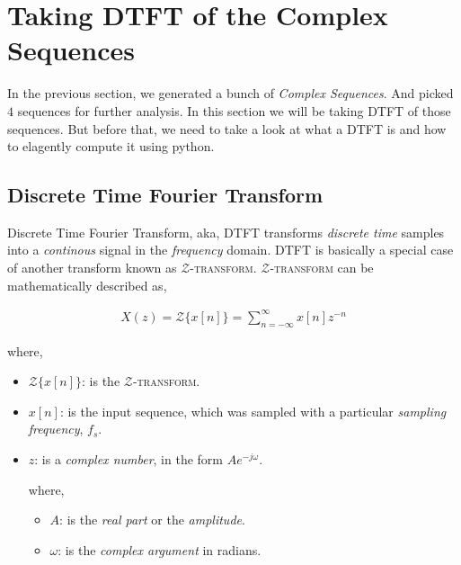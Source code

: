 \documentclass[../../course]{subfiles}
\begin{document}
\def\freqXOne{28}
\def\freqXTwo{56}
\def\freqXThree{56.1}

\def\sampFreqMuchLess{\textbf{(a):} $f_{s} = \frac{4 \times 28}{2} = 56 \si{Hz}$}
\def\sampFreqNorm{\textbf{(b):} $f_{s} = 4 \times 28 = 112 \si{Hz}$}
\def\sampFreqSligGreat{\textbf{(c):} $f_{s} = (4 \times 28) + 10 = 122 \si{Hz}$}
\def\sampFreqMuchGreat{\textbf{(d):} $f_{s} = 4 \times 28 \times 6 = 672 \si{Hz}$}

\section{Taking DTFT of the Complex Sequences} \label{sec:wrkTakingDTFTCplxSeqs}

In the previous section, we generated a bunch of \emph{Complex Sequences}. And
picked $4$ sequences for further analysis. In this section we will be taking
\textsc{DTFT} of those sequences. But before that, we need to take a look at what
a \textsc{DTFT} is and how to elagently compute it using python.

\subsection{Discrete Time Fourier Transform}

Discrete Time Fourier Transform, aka, \textsc{DTFT} transforms \emph{discrete time}
samples into a \emph{continous} signal in the \emph{frequency} domain. \textsc{DTFT}
is basically a special case of another transform known as $\mathcal{Z}$\textsc{-transform}.
$\mathcal{Z}$\textsc{-transform} can be mathematically described as,

\begin{align}
    X(z) = {\mathcal{Z}}\{x[n]\} = \sum_{n = - \infty}^{\infty} x[n] z^{-n}
\end{align}

where,

\begin{itemize} [label=]

    \item ${\mathcal{Z}}\{x[n]\}$: is the $\mathcal{Z}$\textsc{-transform}.
    \item $x[n]$: is the input sequence, which was sampled with a
        particular \emph{sampling frequency}, $f_{s}$.
    \item $z$: is a \emph{complex number}, in the form $A e^{-j \omega}$.

        where,

        \begin{itemize} [label=]
            \item $A$: is the \emph{real part} or the \emph{amplitude}.
            \item $\omega$: is the \emph{complex argument} in radians.
        \end{itemize}

\end{itemize}
\end{document}
